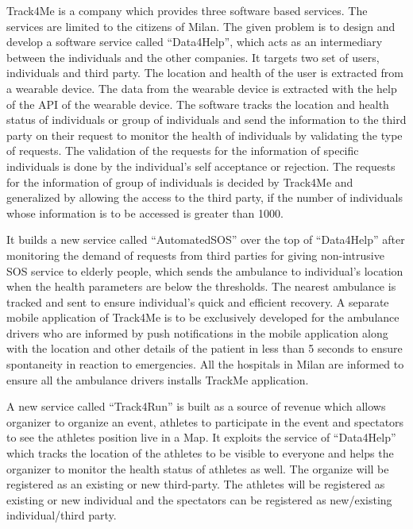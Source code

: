 \qquad Track4Me is a company which provides three software based services. The services are limited to the citizens of Milan. The given problem is to design and develop a software service called  “Data4Help”,  which acts as an intermediary between the individuals and the other companies. It targets two set of users, individuals and third party. The location and health of the user is extracted from a wearable device. The data from the wearable device is extracted with the help of the API of the wearable device. The software tracks the location and health status of individuals or group of individuals and send the information to the third party on their request to monitor the health of individuals by validating the type of requests. The validation of the requests for the information of specific individuals is done by the individual’s self acceptance or rejection. The requests for the information of group of individuals is decided by Track4Me and generalized by allowing the access to the third party, if the number of individuals whose information is to be accessed is greater than 1000.

\qquad It builds a new service called “AutomatedSOS” over the top of “Data4Help” after monitoring the demand of requests from third parties for giving non-intrusive SOS service to elderly people, which sends the ambulance to individual’s location when the health parameters are below the thresholds. The nearest ambulance is tracked and sent to ensure individual’s quick and efficient recovery. A separate mobile application of Track4Me is to be exclusively developed for the ambulance drivers who are informed by push notifications in the mobile application along with the location and other details of the patient in less than 5 seconds to ensure spontaneity in reaction to emergencies. All the hospitals in Milan are informed to ensure all the ambulance drivers installs TrackMe application.

\qquad A new service called “Track4Run” is built as a source of revenue which allows organizer to organize an event, athletes to participate in the event and spectators to see the athletes position live in a Map. It exploits the service of “Data4Help” which tracks the location of the athletes to be visible to everyone and helps the organizer to monitor the health status of athletes as well. The organize will be registered as an existing or new third-party. The athletes will be registered as existing or new individual and the spectators can be registered as new/existing individual/third party.

